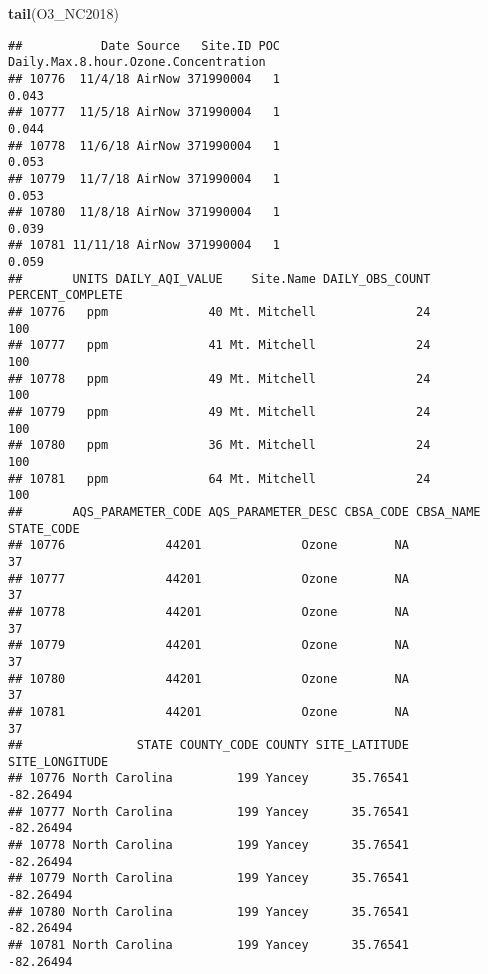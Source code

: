 \documentclass[]{article}
\newenvironment{Shaded}{\begin{snugshade}}{\end{snugshade}}
\newcommand{\KeywordTok}[1]{\textcolor[rgb]{0.13,0.29,0.53}{\textbf{#1}}}
\newcommand{\OperatorTok}[1]{\textcolor[rgb]{0.81,0.36,0.00}{\textbf{#1}}}
\newcommand{\NormalTok}[1]{#1}
\begin{document}
\begin{Shaded}
\begin{Highlighting}[]
\KeywordTok{tail}\NormalTok{(O3_NC2018)}
\end{Highlighting}
\end{Shaded}

\begin{verbatim}
##           Date Source   Site.ID POC Daily.Max.8.hour.Ozone.Concentration
## 10776  11/4/18 AirNow 371990004   1                                0.043
## 10777  11/5/18 AirNow 371990004   1                                0.044
## 10778  11/6/18 AirNow 371990004   1                                0.053
## 10779  11/7/18 AirNow 371990004   1                                0.053
## 10780  11/8/18 AirNow 371990004   1                                0.039
## 10781 11/11/18 AirNow 371990004   1                                0.059
##       UNITS DAILY_AQI_VALUE    Site.Name DAILY_OBS_COUNT PERCENT_COMPLETE
## 10776   ppm              40 Mt. Mitchell              24              100
## 10777   ppm              41 Mt. Mitchell              24              100
## 10778   ppm              49 Mt. Mitchell              24              100
## 10779   ppm              49 Mt. Mitchell              24              100
## 10780   ppm              36 Mt. Mitchell              24              100
## 10781   ppm              64 Mt. Mitchell              24              100
##       AQS_PARAMETER_CODE AQS_PARAMETER_DESC CBSA_CODE CBSA_NAME STATE_CODE
## 10776              44201              Ozone        NA                   37
## 10777              44201              Ozone        NA                   37
## 10778              44201              Ozone        NA                   37
## 10779              44201              Ozone        NA                   37
## 10780              44201              Ozone        NA                   37
## 10781              44201              Ozone        NA                   37
##                STATE COUNTY_CODE COUNTY SITE_LATITUDE SITE_LONGITUDE
## 10776 North Carolina         199 Yancey      35.76541      -82.26494
## 10777 North Carolina         199 Yancey      35.76541      -82.26494
## 10778 North Carolina         199 Yancey      35.76541      -82.26494
## 10779 North Carolina         199 Yancey      35.76541      -82.26494
## 10780 North Carolina         199 Yancey      35.76541      -82.26494
## 10781 North Carolina         199 Yancey      35.76541      -82.26494
\end{verbatim}

\begin{Shaded}
\end{Shaded}
\end{document}
